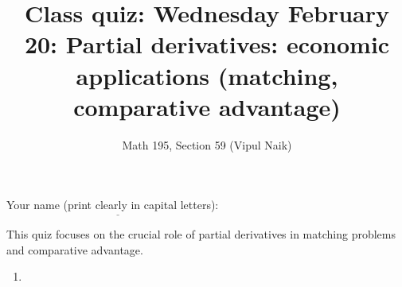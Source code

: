 \documentclass[10pt]{amsart}
\title{Class quiz: Wednesday February 20: Partial derivatives: economic applications (matching, comparative advantage)}
\author{Math 195, Section 59 (Vipul Naik)}
\begin{document}
\maketitle

Your name (print clearly in capital letters): $\underline{\qquad\qquad\qquad\qquad\qquad\qquad\qquad\qquad\qquad\qquad}$

This quiz focuses on the crucial role of partial derivatives in
matching problems and comparative advantage.

\begin{enumerate}

\item 
\end{enumerate}
\end{document}
